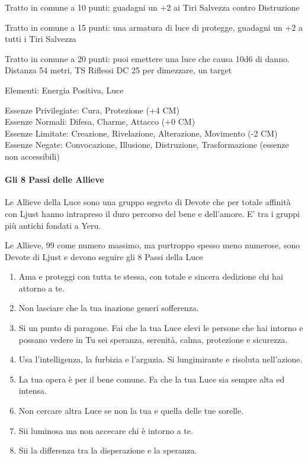 \documentclass[a4paper,11pt,twoside,openany]{book}
\begin{document}
Tratto in comune a 10 punti: guadagni un +2 ai Tiri Salvezza contro Distruzione

Tratto in comune a 15 punti: una armatura di luce di protegge, guadagni un +2 a tutti i Tiri Salvezza

Tratto in comune a 20 punti: puoi emettere una luce che causa 10d6 di danno. Distanza 54 metri, TS Riflessi DC 25 per dimezzare, un target

\bigskip

Elementi: Energia Positiva, Luce

\bigskip

Essenze Privilegiate: Cura, Protezione (+4 CM)\\
Essenze Normali: Difesa, Charme, Attacco (+0 CM)\\
Essenze Limitate: Creazione, Rivelazione, Alterazione, Movimento (-2 CM)
Essenze Negate: Convocazione, Illusione, Distruzione, Trasformazione (essenze non accessibili)

\paragraph{Gli 8 Passi delle Allieve}

\label{gli-8-passi-delle-allieve}

Le Allieve della Luce sono una gruppo segreto di Devote che per totale affinità con Ljust hanno intrapreso il duro percorso del bene e dell'amore. E' tra i gruppi più antichi fondati a Yeru.

Le Allieve, 99 come numero massimo, ma purtroppo spesso meno numerose, sono Devote di Ljust e devono seguire gli 8 Passi della Luce

\begin{enumerate}
	\item Ama e proteggi con tutta te stessa, con totale e sincera dedizione chi hai attorno a te.

	\item Non lasciare che la tua inazione generi sofferenza.

	\item Si un punto di paragone. Fai che la tua Luce elevi le persone che hai intorno e possano vedere in Tu sei speranza, serenità, calma, protezione e sicurezza.

	\item Usa l'intelligenza, la furbizia e l'arguzia. Si lungimirante e risoluta nell'azione.

	\item La tua opera è per il bene comune. Fa che la tua Luce sia sempre alta ed intensa.

	\item Non cercare altra Luce se non la tua e quella delle tue sorelle.

	\item Sii luminosa ma non accecare chi è intorno a te.

	\item Sii la differenza tra la disperazione e la speranza.
\end{enumerate}
\end{document}
